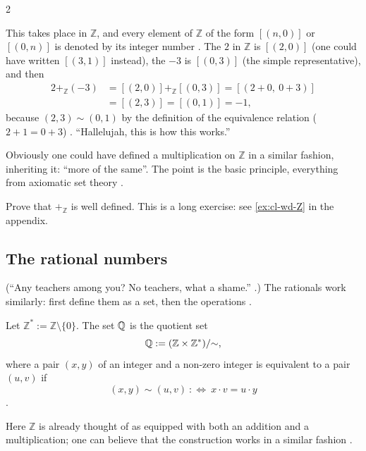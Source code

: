 \begin{paracol}{2}
\begin{example}[$2+(-3)$ in $\mathbb Z$]\label{ex:cl-2m3}
This takes place in $\mathbb Z$, and every element of $\mathbb Z$ of the form $[(n,0)]$ or $[(0,n)]$ is denoted by its integer
number . The $2$ in $\mathbb Z$ is $[(2,0)]$ (one could have written $[(3,1)]$ instead), the $-3$
is $[(0,3)]$ (the simple representative), and then
\[
  \begin{aligned}
  2+_{\mathbb Z}(-3)&=[(2,0)]+_{\mathbb Z}[(0,3)]=[(2+0,\ 0+3)]\\
  &=[(2,3)]=[(0,1)]=-1,
  \end{aligned}
\]
because $(2,3)\sim(0,1)$ by the definition of the equivalence relation ($2+1=0+3$) .
``Hallelujah, this is how this works.''
\end{example}
Obviously one could have defined a multiplication on $\mathbb Z$ in a similar fashion, inheriting it: ``more of the same''. The
point is the basic principle, everything from axiomatic set theory .

\begin{exercise}
Prove that $+_{\mathbb Z}$ is well defined. This is a long exercise: see \cref{ex:cl-wd-Z} in the appendix.
\end{exercise}

\subsection*{The rational numbers}

(``Any teachers among you? No teachers, what a shame.'' .) The rationals work similarly: first define them as
a set, then the operations .

\begin{definition}\label{def:cl-Q}
Let $\mathbb Z^*:=\mathbb Z\setminus\{0\}$. The set $\mathbb{Q}$ is the quotient set
\[
  \mathbb{Q}:=(\mathbb Z\times\mathbb Z^*)/{\sim},
\]
where a pair $(x,y)$ of an integer and a non-zero integer is equivalent to a pair $(u,v)$ if
\[
  (x,y)\sim(u,v)\ :\Longleftrightarrow\ x\cdot v=u\cdot y
\]
.
\end{definition}
Here $\mathbb Z$ is already thought of as equipped with both an addition and a multiplication; one can believe that the
construction works in a similar fashion .


\end{paracol}

